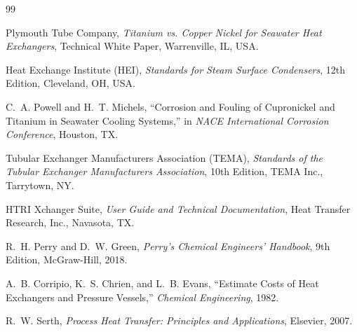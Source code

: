 \documentclass[12pt,a4paper]{article}
\begin{document}
\begin{thebibliography}{99}

Plymouth Tube Company, \textit{Titanium vs. Copper Nickel for Seawater Heat Exchangers}, Technical White Paper, Warrenville, IL, USA.

Heat Exchange Institute (HEI), \textit{Standards for Steam Surface Condensers}, 12th Edition, Cleveland, OH, USA.

C.~A. Powell and H.~T. Michels, ``Corrosion and Fouling of Cupronickel and Titanium in Seawater Cooling Systems,'' in \textit{NACE International Corrosion Conference}, Houston, TX.

Tubular Exchanger Manufacturers Association (TEMA), \textit{Standards of the Tubular Exchanger Manufacturers Association}, 10th Edition, TEMA Inc., Tarrytown, NY.

HTRI Xchanger Suite, \textit{User Guide and Technical Documentation}, Heat Transfer Research, Inc., Navasota, TX.

R.~H. Perry and D.~W. Green, \textit{Perry's Chemical Engineers' Handbook}, 9th Edition, McGraw-Hill, 2018.

A.~B. Corripio, K.~S. Chrien, and L.~B. Evans, ``Estimate Costs of Heat Exchangers and Pressure Vessels,'' \textit{Chemical Engineering}, 1982.

R.~W. Serth, \textit{Process Heat Transfer: Principles and Applications}, Elsevier, 2007.

\end{thebibliography}
\end{document}
